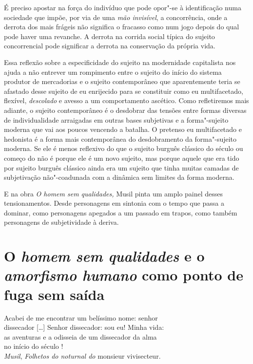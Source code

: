 É preciso apostar na força do indivíduo que pode opor"-se à identificação
numa sociedade que impõe, por via de uma \emph{mão invisível}, a
concorrência, onde a derrota dos mais frágeis não significa o fracasso
como num jogo depois do qual pode haver uma revanche. A derrota na
corrida social típica do sujeito concorrencial pode significar a derrota
na conservação da própria vida.

Essa reflexão sobre a especificidade do sujeito na modernidade
capitalista nos ajuda a não entrever um rompimento entre o sujeito do
início do sistema produtor de mercadorias e o sujeito contemporâneo que
aparentemente teria se afastado desse sujeito de eu enrijecido para se
constituir como eu multifacetado, flexível, \emph{descolado} e avesso a
um comportamento ascético. Como refletiremos mais adiante, o sujeito
contemporâneo é o desdobrar das tensões entre formas diversas de
individualidade arraigadas em outras bases subjetivas e a forma"-sujeito
moderna que vai aos poucos vencendo a batalha. O pretenso eu
multifacetado e hedonista é a forma mais contemporânea do desdobramento
da forma"-sujeito moderna. Se ele é menos reflexivo do que o sujeito
burguês clássico do século  ou começo do  não é porque ele é um
novo sujeito, mas porque aquele que era tido por sujeito burguês
clássico ainda era um sujeito que tinha muitas camadas de subjetivação
não"-coadunada com a dinâmica sem limites da forma moderna.

E na obra \emph{O homem sem qualidades,} Musil pinta um amplo painel
desses tensionamentos. Desde personagens em sintonia com o tempo que
passa a dominar, como personagens apegados a um passado em trapos, como
também personagens de subjetividade à deriva.

\section{O \emph{homem sem qualidades} e o \emph{amorfismo humano} como ponto de fuga sem saída}

\bigskip

\begin{flushright}
\scriptsize{Acabei de me encontrar um belíssimo nome: senhor\\
dissecador [\ldots{}] Senhor dissecador: sou eu! Minha vida:\\
as aventuras e a odisseia de um dissecador da alma\\
no início do século !\\

\emph{Musil}, \emph{Folhetos do noturnal do} monsieur vivisecteur.}
\end{flushright}

